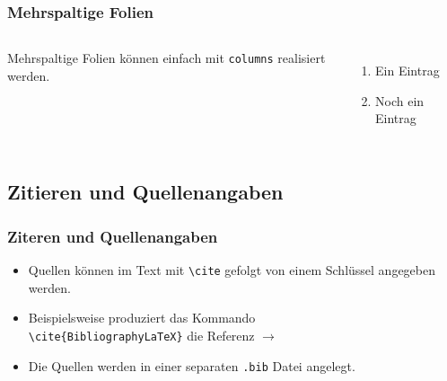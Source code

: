 \begin{frame}
	\frametitle{Mehrspaltige Folien}
	\begin{columns}
		Mehrspaltige Folien können einfach mit \texttt{columns} realisiert werden.
		\begin{enumerate}
			\item Ein Eintrag
			\item Noch ein Eintrag
		\end{enumerate}
	\end{columns}
\end{frame}

\subsection{Zitieren und Quellenangaben}


\begin{frame}[fragile]
	\frametitle{Ziteren und Quellenangaben}
	
	\begin{itemize}
		\item Quellen können im Text mit \verb|\cite| gefolgt von einem Schlüssel angegeben werden.
		\item Beispielsweise produziert das Kommando\\ \verb|\cite{BibliographyLaTeX}|
		 die Referenz $\rightarrow$ \cite{BibliographyLaTeX}
		 \item Die Quellen werden in einer separaten \texttt{.bib} Datei angelegt.
	\end{itemize}
	
\end{frame}

